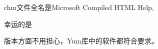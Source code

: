 \documentclass[a4paper]{article}
\begin{document}
chm文件全名是Microsoft Compiled HTML Help,

    幸运的是


版本方面不用担心，Yum库中的软件都符合要求。
\end{document}
